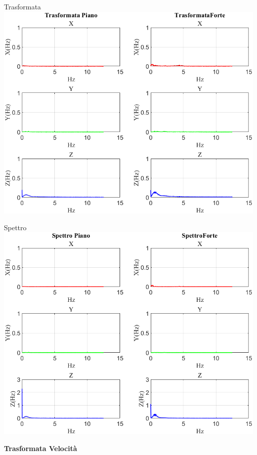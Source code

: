 	\begin{frame}{{Trasformata}}
		\centering\includegraphics[height=.8\textheight]{figure/Vel/Trasformata/Trasformata}
	\end{frame}
	
	\begin{frame}{{Spettro}}
		\centering\includegraphics[height=.8\textheight]{figure/Vel/Trasformata/Spettro}
	\end{frame}
	
	\begin{frame}
		\color{blue}\centering\huge{\textbf{Trasformata Velocità}}
	\end{frame}

